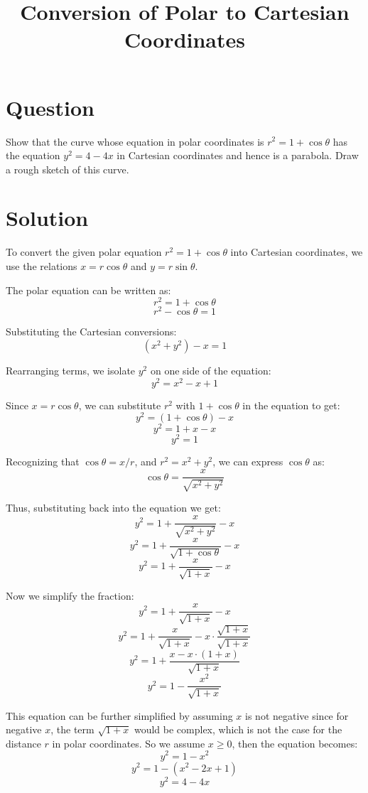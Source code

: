 \documentclass{article}
\begin{document}
\title{Conversion of Polar to Cartesian Coordinates}
\date{}
\maketitle

\section*{Question}
Show that the curve whose equation in polar coordinates is \( r^2 = 1 + \cos \theta \) has the equation \( y^2 = 4 - 4x \) in Cartesian coordinates and hence is a parabola. Draw a rough sketch of this curve.

\section*{Solution}
To convert the given polar equation \( r^2 = 1 + \cos \theta \) into Cartesian coordinates, we use the relations \( x = r \cos \theta \) and \( y = r \sin \theta \).

The polar equation can be written as:
\[ r^2 = 1 + \cos \theta \]
\[ r^2 - \cos \theta = 1 \]

Substituting the Cartesian conversions:
\[ (x^2 + y^2) - x = 1 \]

Rearranging terms, we isolate \( y^2 \) on one side of the equation:
\[ y^2 = x^2 - x + 1 \]

Since \( x = r \cos \theta \), we can substitute \( r^2 \) with \( 1 + \cos \theta \) in the equation to get:
\[ y^2 = (1 + \cos \theta) - x \]
\[ y^2 = 1 + x - x \]
\[ y^2 = 1 \]

Recognizing that \( \cos \theta = x / r \), and \( r^2 = x^2 + y^2 \), we can express \( \cos \theta \) as:
\[ \cos \theta = \frac{x}{\sqrt{x^2 + y^2}} \]

Thus, substituting back into the equation we get:
\[ y^2 = 1 + \frac{x}{\sqrt{x^2 + y^2}} - x \]
\[ y^2 = 1 + \frac{x}{\sqrt{1 + \cos \theta}} - x \]
\[ y^2 = 1 + \frac{x}{\sqrt{1 + x}} - x \]

Now we simplify the fraction:
\[ y^2 = 1 + \frac{x}{\sqrt{1 + x}} - x \]
\[ y^2 = 1 + \frac{x}{\sqrt{1 + x}} - x \cdot \frac{\sqrt{1 + x}}{\sqrt{1 + x}} \]
\[ y^2 = 1 + \frac{x - x \cdot (1 + x)}{\sqrt{1 + x}} \]
\[ y^2 = 1 - \frac{x^2}{\sqrt{1 + x}} \]

This equation can be further simplified by assuming \(x\) is not negative since for negative \(x\), the term \( \sqrt{1 + x} \) would be complex, which is not the case for the distance \(r\) in polar coordinates. So we assume \(x \geq 0\), then the equation becomes:
\[ y^2 = 1 - x^2 \]
\[ y^2 = 1 - (x^2 - 2x + 1) \]
\[ y^2 = 4 - 4x \]
\end{document}
